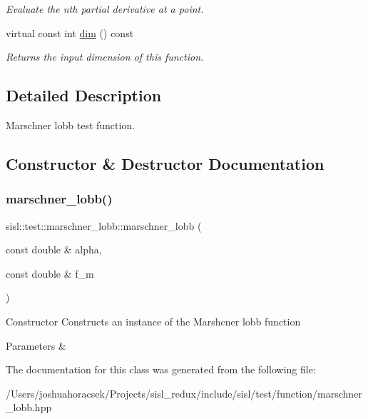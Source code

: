 \begin{DoxyCompactItemize}
\begin{DoxyCompactList}\small\item\em Evaluate the n\textquotesingle{}th partial derivative at a point. \end{DoxyCompactList}\item 
\mbox{\label{classsisl_1_1test_1_1marschner__lobb_af1cd7b28be67f9078d3aff92cf32f054}} 
virtual const int \hyperlink{classsisl_1_1test_1_1marschner__lobb_af1cd7b28be67f9078d3aff92cf32f054}{dim} () const
\begin{DoxyCompactList}\small\item\em Returns the input dimension of this function. \end{DoxyCompactList}\end{DoxyCompactItemize}


\subsection{Detailed Description}
Marschner lobb test function. 

\subsection{Constructor \& Destructor Documentation}
\mbox{\label{classsisl_1_1test_1_1marschner__lobb_a48a8f4116a2e924820417b0191864e20}} 
\subsubsection{\texorpdfstring{marschner\+\_\+lobb()}{marschner\_lobb()}}
{\footnotesize\ttfamily sisl\+::test\+::marschner\+\_\+lobb\+::marschner\+\_\+lobb (\begin{DoxyParamCaption}\item[{const double \&}]{alpha,  }\item[{const double \&}]{f\+\_\+m }\end{DoxyParamCaption})\hspace{0.3cm}{\ttfamily [inline]}}

Constructor Constructs an instance of the Marshcner lobb function 
\begin{DoxyParams}{Parameters}
{\em } & \\
\hline
\end{DoxyParams}


The documentation for this class was generated from the following file\+:\begin{DoxyCompactItemize}
\item 
/\+Users/joshuahoracsek/\+Projects/sisl\+\_\+redux/include/sisl/test/function/marschner\+\_\+lobb.\+hpp\end{DoxyCompactItemize}

